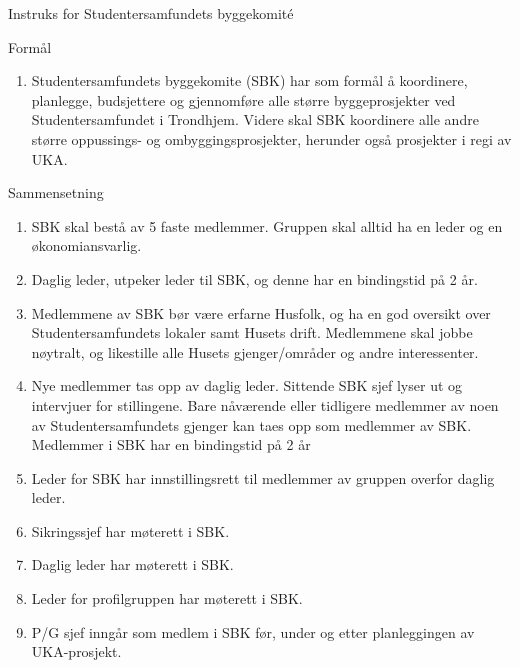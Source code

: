 
\begin{instruks}{Instruks for Studentersamfundets byggekomité}{}{}

    \begin{instruksledd}{Formål}
        \begin{enumerate}
            \item Studentersamfundets byggekomite (SBK) har som formål å koordinere, planlegge,
                budsjettere og
                gjennomføre alle større byggeprosjekter ved Studentersamfundet i Trondhjem. Videre
                skal SBK koordinere
                alle andre større oppussings- og ombyggingsprosjekter, herunder også prosjekter i
                regi av UKA.
        \end{enumerate}
    \end{instruksledd}

    \begin{instruksledd}{Sammensetning}
        \begin{enumerate}
            \item SBK skal bestå av 5 faste medlemmer. Gruppen skal alltid ha en leder og en
                økonomiansvarlig.
            \item Daglig leder, utpeker leder til SBK, og denne har en bindingstid på 2 år.
            \item Medlemmene av SBK bør være erfarne Husfolk, og ha en god oversikt over
                Studentersamfundets lokaler
                samt Husets drift. Medlemmene skal jobbe nøytralt, og likestille alle Husets
                gjenger/områder og andre
                interessenter.
            \item Nye medlemmer tas opp av daglig leder. Sittende SBK sjef lyser ut og intervjuer
                for stillingene. Bare
                nåværende eller tidligere medlemmer av noen av Studentersamfundets gjenger kan
                taes opp som medlemmer
                av SBK. Medlemmer i SBK har en bindingstid på 2 år
            \item Leder for SBK har innstillingsrett til medlemmer av gruppen overfor daglig
                leder.
            \item Sikringssjef har møterett i SBK.
            \item Daglig leder har møterett i SBK.
            \item Leder for profilgruppen har møterett i SBK.
            \item P/G sjef inngår som medlem i SBK før, under og etter planleggingen av UKA-prosjekt.
        \end{enumerate}
    \end{instruksledd}


\end{instruks}
